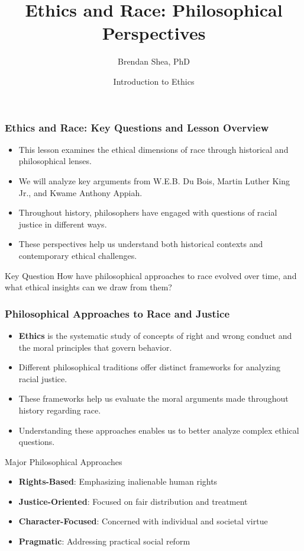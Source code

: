 \documentclass{beamer}
\title{Ethics and Race: Philosophical Perspectives}
\author{Brendan Shea, PhD}
\date{Introduction to Ethics}
\begin{document}
	
	\begin{frame}
	\titlepage
	\end{frame}
	
	
	\begin{frame}
		\frametitle{Ethics and Race: Key Questions and Lesson Overview}
		
		\begin{itemize}
			\item This lesson examines the ethical dimensions of race through historical and philosophical lenses.
			\item We will analyze key arguments from W.E.B. Du Bois, Martin Luther King Jr., and Kwame Anthony Appiah.
			\item Throughout history, philosophers have engaged with questions of racial justice in different ways.
			\item These perspectives help us understand both historical contexts and contemporary ethical challenges.
		\end{itemize}
		
		\begin{alertblock}{Key Question}
			How have philosophical approaches to race evolved over time, and what ethical insights can we draw from them?
		\end{alertblock}
		
	\end{frame}
	
	\begin{frame}
		\frametitle{Philosophical Approaches to Race and Justice}
		
		\begin{itemize}
			\item \textbf{Ethics} is the systematic study of concepts of right and wrong conduct and the moral principles that govern behavior.
			\item Different philosophical traditions offer distinct frameworks for analyzing racial justice.
			\item These frameworks help us evaluate the moral arguments made throughout history regarding race.
			\item Understanding these approaches enables us to better analyze complex ethical questions.
		\end{itemize}
		
		\begin{block}{Major Philosophical Approaches}
			\begin{itemize}
				\item \textbf{Rights-Based}: Emphasizing inalienable human rights
				\item \textbf{Justice-Oriented}: Focused on fair distribution and treatment
				\item \textbf{Character-Focused}: Concerned with individual and societal virtue
				\item \textbf{Pragmatic}: Addressing practical social reform
			\end{itemize}
		\end{block}
		
	\end{frame}
	
\end{document}
